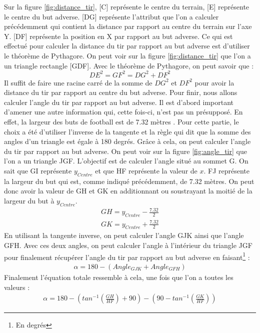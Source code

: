\documentclass[12pt]{article}
\begin{document}
Sur la figure \ref{fig:distance_tir}, [C] représente le centre du terrain, [E] représente le centre du but adverse.
[DG] représente l'attribut que l'on a calculer précédemment qui contient la distance par rapport au centre du terrain sur l'axe Y.
[DF] représente la position en X par rapport au but adverse.
Ce qui est effectué pour calculer la distance du tir par rapport au but adverse est d'utiliser le théorème de Pythagore.
On peut voir sur la figure \ref{fig:distance_tir} que l'on a un triangle rectangle [GDF].
Avec le théorème de Pythagore, on peut savoir que :
\begin{equation}
    DE^2 = GF^2 = DG^2 + DF^2
\end{equation}
Il suffit de faire une racine carré de la somme de $DG^2$ et $DF^2$ pour avoir la distance du tir par rapport au centre du but adverse.
\newline\newline
Pour finir, nous allons calculer l'angle du tir par rapport au but adverse.
Il est d'abord important d'amener une autre information qui, cette fois-ci, n'est pas un présupposé.
En effet, la largeur des buts de football est de 7.32 mètres \cite{TerrainIFAB}.
Pour cette partie, le choix a été d'utiliser l'inverse de la tangente et la règle qui dit que la somme des angles d'un triangle est égale à 180 degrés.
Grâce à cela, on peut calculer l'angle du tir par rapport au but adverse.
On peut voir sur la figure \ref{fig:angle_tir} que l'on a un triangle JGF.
L'objectif est de calculer l'angle situé au sommet G.
On sait que GI représente $y_{Centre}$ et que HF représente la valeur de $x$.
FJ représente la largeur du but qui est, comme indiqué précédemment, de 7.32 mètres.
On peut donc avoir la valeur de GH et GK en additionnant ou soustrayant la moitié de la largeur du but à $y_{Centre}$.
\begin{equation}
    \begin{split}
        GH = y_{Centre} - \frac{7.32}{2} \\
        GK = y_{Centre} + \frac{7.32}{2}
    \end{split}
\end{equation}
En utilisant la tangente inverse, on peut calculer l'angle GJK ainsi que l'angle GFH.
Avec ces deux angles, on peut calculer l'angle à l'intérieur du triangle JGF pour finalement récupérer l'angle du tir par rapport au but adverse en faisant\footnote{En degrés} :
\begin{equation}
    \begin{split}
        \alpha = 180 - (Angle_{GJK} + Angle_{GFH})
    \end{split}
\end{equation}
Finalement l'équation totale ressemble à cela, une fois que l'on a toutes les valeurs :
\begin{equation}
    \begin{split}
        \alpha = 180 - (tan^{-1}(\frac{GH}{HF}) + 90) - (90 -tan^{-1}(\frac{GK}{HF}))
    \end{split}
\end{equation}
\end{document}
